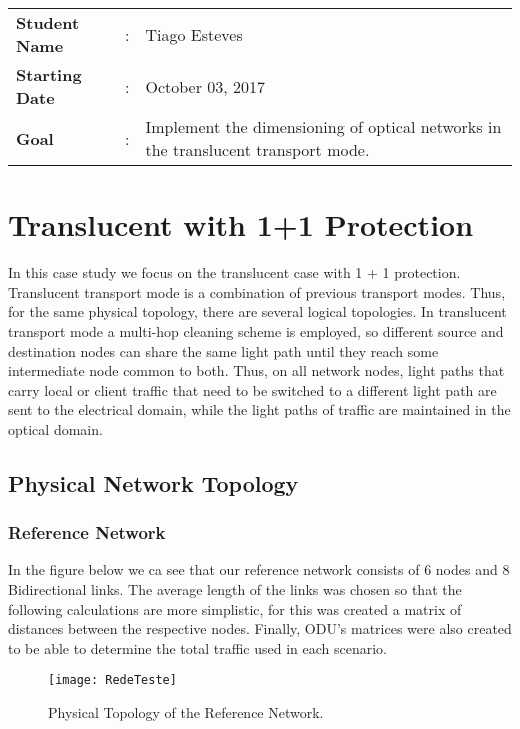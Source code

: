 \clearpage

\begin{tcolorbox}	
\begin{tabular}{p{2.75cm} p{0.2cm} p{10.5cm}} 	
\textbf{Student Name}  &:& Tiago Esteves\\
\textbf{Starting Date} &:& October 03, 2017\\
\textbf{Goal}          &:& Implement the dimensioning of optical networks in the translucent transport mode.
\end{tabular}
\end{tcolorbox}

\section{Translucent with 1+1 Protection}

In this case study we focus on the translucent case with 1 + 1 protection. Translucent transport mode is a combination of previous transport modes. Thus, for the same physical topology, there are several logical topologies.
In translucent transport mode a multi-hop cleaning scheme is employed, so different source and destination nodes can share the same light path until they reach some intermediate node common to both.
Thus, on all network nodes, light paths that carry local or client traffic that need to be switched to a different light path are sent to the electrical domain, while the light paths of traffic are maintained in the optical domain.

\subsection{Physical Network Topology}

\subsubsection{Reference Network}
In the figure below we ca see that our reference network consists of 6 nodes and 8 Bidirectional links.
The average length of the links was chosen so that the following calculations are more simplistic, for this was created a matrix of distances between the respective nodes.
Finally, ODU's matrices were also created to be able to determine the total traffic used in each scenario.

\begin{figure}[h!]
\centering
\texttt{[image: RedeTeste]}
\caption{Physical Topology of the Reference Network.}
\end{figure}

